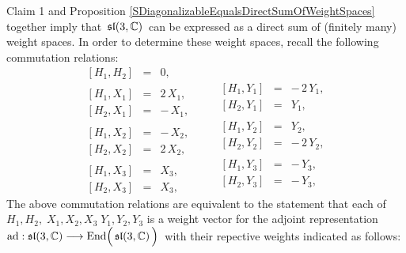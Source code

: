\vskip 0.3cm
\noindent
Claim 1 and Proposition \ref{SDiagonalizableEqualsDirectSumOfWeightSpaces} together imply that
\,$\mathfrak{sl}(3,\mathbb{C})$\, can be expressed as a direct sum of (finitely many) {\color{red}weight} spaces.
In order to determine these weight spaces, recall the following commutation relations:
\begin{equation*}
\begin{array}{ccr}
\left[H_{1},H_{2}\right] &=& 0,
\\ \\
\left[H_{1},X_{1}\right] &=& 2\,X_{1},
\\
\left[H_{2},X_{1}\right] &=& -\,X_{1},
\\ \\
\left[H_{1},X_{2}\right] &=& -\,X_{2},
\\
\left[H_{2},X_{2}\right] &=& 2\,X_{2},
\\ \\
\left[H_{1},X_{3}\right] &=& X_{3},
\\
\left[H_{2},X_{3}\right] &=& X_{3},
\end{array}
\quad\quad
\begin{array}{ccr}
&&
\\ \\
\left[H_{1},Y_{1}\right] &=& -\,2\,Y_{1},
\\
\left[H_{2},Y_{1}\right] &=& Y_{1},
\\ \\
\left[H_{1},Y_{2}\right] &=& Y_{2},
\\
\left[H_{2},Y_{2}\right] &=& -\,2\,Y_{2},
\\ \\
\left[H_{1},Y_{3}\right] &=& -\,Y_{3},
\\
\left[H_{2},Y_{3}\right] &=& -\,Y_{3},
\end{array}
\end{equation*}
The above commutation relations are equivalent to the statement that each of
\;$H_{1},H_{2},\; X_{1},X_{2},X_{3}\; Y_{1},Y_{2},Y_{3}$\;
is a weight vector for the adjoint representation
\,$\ad : \sl(3,\C) \longrightarrow \End\!\left(\,\overset{{\color{white}.}}{\sl(3,\C)}\,\right)$\,
with their repective weights indicated as follows:
